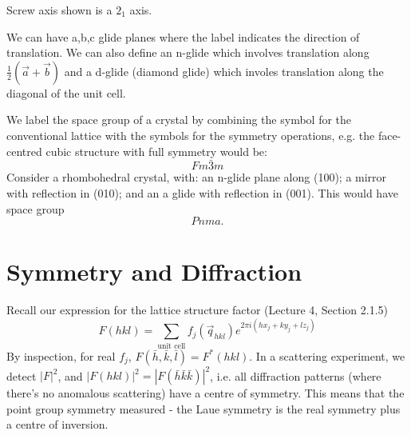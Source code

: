 \documentclass[a4paper, 11pt, normalem]{report}
\begin{document}
Screw axis shown is a $2_1$ axis.

We can have a,b,c glide planes where the label indicates the direction of translation.
We can also define an n-glide which involves translation along $\frac{1}{2}(\vec{a}+\vec{b})$ and a d-glide (diamond glide) which involes translation along the diagonal of the unit cell.

We label the space group of a crystal by combining the symbol for the conventional lattice with the symbols for the symmetry operations, e.g. the face-centred cubic structure with full symmetry would be:
\begin{equation}
    Fm\bar{3}m
\end{equation}
Consider a rhombohedral crystal, with: an n-glide plane along (100); a mirror with reflection in (010); and an a glide with reflection in (001).
This would have space group
\begin{equation}
    Pnma.
\end{equation}

\section{Symmetry and Diffraction}
Recall our expression for the lattice structure factor (Lecture 4, Section 2.1.5)
\begin{equation}
    F(hkl) = \sum_{\text{unit cell}} f_j(\vec{q}_{hkl})e^{2\pi i(hx_j + ky_j + lz_j)}
\end{equation}
By inspection, for real $f_j$, $F(\bar{h},\bar{k},\bar{l}) = F^*(hkl)$.
In a scattering experiment, we detect $|F|^2$, and $|F(hkl)|^2 = |F(\bar{h}\bar{k}\bar{k})|^2$, i.e. all diffraction patterns (where there's no anomalous scattering) have a centre of symmetry.
This means that the point group symmetry measured - the Laue symmetry is the real symmetry plus a centre of inversion.
\end{document}
